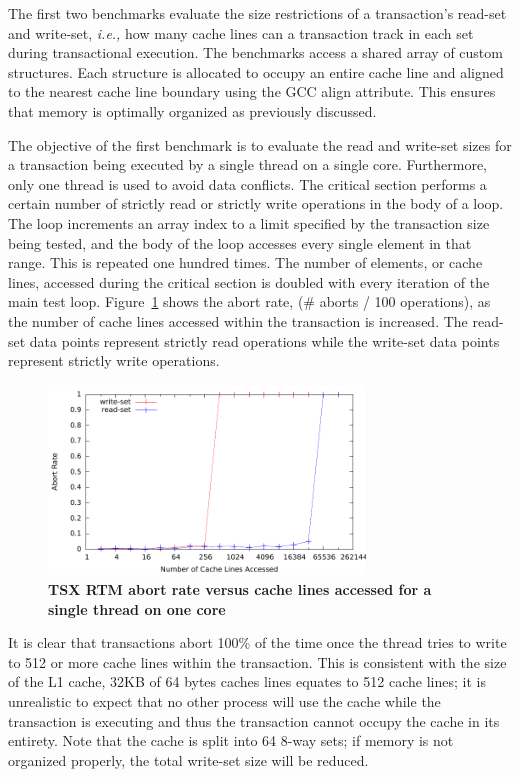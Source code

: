 \documentclass[11pt]{book}
\begin{document}
The first two benchmarks evaluate the size restrictions of a transaction's
read-set and write-set, \emph{i.e.,} how many cache lines can a transaction
track in each set during transactional execution.  The benchmarks access a
shared array of custom structures.  Each structure is allocated to occupy an
entire cache line and aligned to the nearest cache line boundary using the GCC
align attribute.  This ensures that memory is optimally organized as previously
discussed.  

The objective of the first benchmark is to evaluate the read and write-set sizes
for a transaction being executed by a single thread on a single core.
Furthermore, only one thread is used to avoid data conflicts.  The critical
section performs a certain number of strictly read or strictly write operations
in the body of a loop.  The loop increments an array index to a limit specified
by the transaction size being tested, and the body of the loop accesses every
single element in that range.  This is repeated one hundred times.  The number
of elements, or cache lines, accessed during the critical section is doubled
with every iteration of the main test loop.  Figure~\ref{fig:trx_size} shows the
abort rate, (\# aborts / 100 operations), as the number of cache lines accessed
within the transaction is increased.  The read-set data points represent
strictly read operations while the write-set data points represent strictly
write operations.

\begin{figure}[H]
    \centering
    \graphicspath{ {./figures/} }
    \includegraphics[width=0.75\textwidth,keepaspectratio]{trxSize_singleThread}
    \caption{\textbf{TSX RTM abort rate versus cache lines accessed for a single
    thread on one core}}
    \label{fig:trx_size}
\end{figure}

It is clear that transactions abort 100\% of the time once the thread tries to write to
512 or more cache lines within the transaction.  This is consistent with the size of the
L1 cache, 32KB of 64 bytes caches lines equates to 512 cache lines; it is unrealistic to
expect that no other process will use the cache while the transaction is executing and
thus the transaction cannot occupy the cache in its entirety.  Note that the cache is
split into 64 8-way sets; if memory is not organized properly, the total write-set size
will be reduced.
\end{document}
